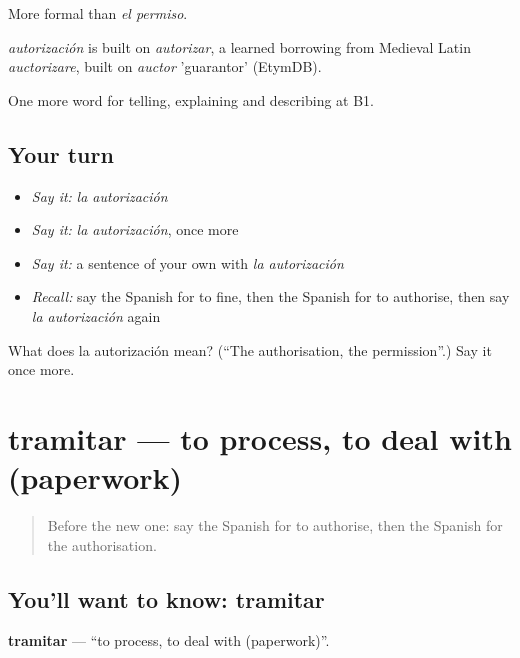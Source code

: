 More formal than \emph{el permiso}.

\begin{cousinweb}
\emph{autorización} is built on \emph{autorizar}, a learned borrowing from Medieval Latin \emph{auctorizare}, built on \emph{auctor} 'guarantor' (EtymDB).
\end{cousinweb}

\begin{grammarlens}[title={What you've built}]
One more word for telling, explaining and describing at B1.
\end{grammarlens}

\subsection*{Your turn}
\begin{itemize}
\raggedright
  \item \emph{Say it:} \emph{la autorización}
  \item \emph{Say it:} \emph{la autorización}, once more
  \item \emph{Say it:} a sentence of your own with \emph{la autorización}
  \item \emph{Recall:} say the Spanish for to fine, then the Spanish for to authorise, then say \emph{la autorización} again
\end{itemize}

\begin{tcolorbox}[breakable,colback=teal!4,colframe=teal!35!black,title={Before you move on}]
What does la autorización mean? (\textquotedblleft{}The authorisation, the permission\textquotedblright{}.) Say it once more.
\end{tcolorbox}
\section[tramitar]{tramitar — to process, to deal with (paperwork)}

\label{lesson:ES-C624-tramitar}



\begin{quote}
Before the new one: say the Spanish for to authorise, then the Spanish for the authorisation.
\end{quote}

\subsection*{You'll want to know: tramitar}
\textbf{tramitar} — \textquotedblleft{}to process, to deal with (paperwork)\textquotedblright{}.

